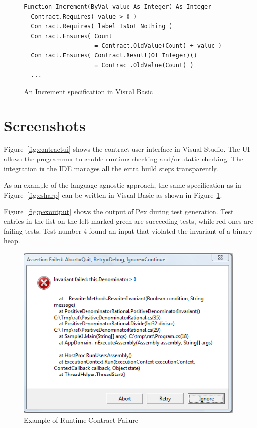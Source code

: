 \documentclass[10pt,twocolumn]{article}
\begin{document}
\begin{figure}[thb]
\begin{small}
\begin{lstlisting}
Function Increment(ByVal value As Integer) As Integer
  Contract.Requires( value > 0 )
  Contract.Requires( label IsNot Nothing )
  Contract.Ensures( Count
                    = Contract.OldValue(Count) + value )
  Contract.Ensures( Contract.Result(Of Integer)()
                    = Contract.OldValue(Count) )
  ...
\end{lstlisting}
\end{small}
\caption{An Increment specification in Visual Basic}
\label{fig:vb}
\end{figure}

\section{Screenshots}
Figure~\ref{fig:contractui} shows the contract user interface in
Visual Studio. The UI allows the programmer to enable runtime checking
and/or static checking. The integration in the IDE manages all the
extra build steps transparently.

As an example of the language-agnostic approach, the same
specification as in Figure~\ref{fig:csharp} can be written in Visual
Basic as shown in Figure~\ref{fig:vb}.

Figure~\ref{fig:pexoutput} shows the output of Pex during test
generation. Test entries in the list on the left marked green are
succeeding tests, while red ones are failing tests. Test number 4
found an input that violated the invariant of a binary heap.


\begin{figure}[htb]
\begin{center}
  \includegraphics[width=\columnwidth]{FoxtrotOutput.png}
\end{center}
\caption{Example of Runtime Contract Failure}
\label{fig:foxtrot}
\end{figure}
\end{document}
